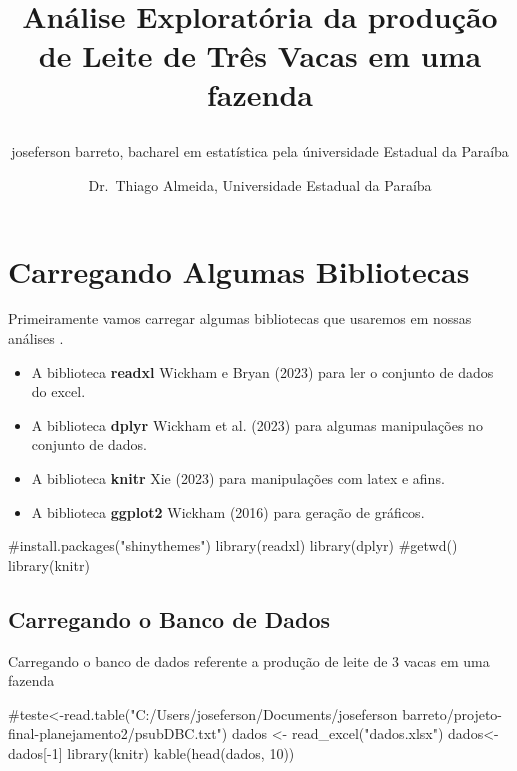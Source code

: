 \documentclass[
  letterpaper,
  DIV=11,
  numbers=noendperiod]{scrartcl}
\title{\\
\strut \\
\strut \\
Análise Exploratória da produção de Leite de Três Vacas em uma fazenda}
\author{joseferson barreto, bacharel em estatística pela úniversidade
Estadual da Paraíba \and Dr.~Thiago Almeida, Universidade Estadual da
Paraíba}
\date{}
\newenvironment{Shaded}{\begin{snugshade}}{\end{snugshade}}
\newcommand{\CommentTok}[1]{\textcolor[rgb]{0.37,0.37,0.37}{#1}}
\newcommand{\DecValTok}[1]{\textcolor[rgb]{0.68,0.00,0.00}{#1}}
\newcommand{\FunctionTok}[1]{\textcolor[rgb]{0.28,0.35,0.67}{#1}}
\newcommand{\NormalTok}[1]{\textcolor[rgb]{0.00,0.23,0.31}{#1}}
\newcommand{\OtherTok}[1]{\textcolor[rgb]{0.00,0.23,0.31}{#1}}
\newcommand{\SpecialCharTok}[1]{\textcolor[rgb]{0.37,0.37,0.37}{#1}}
\newcommand{\StringTok}[1]{\textcolor[rgb]{0.13,0.47,0.30}{#1}}
\renewcommand*\contentsname{Índice}
\newcommand\contentsname{Índice}
\begin{document}
\maketitle

\renewcommand*\contentsname{Sumário}
{
\hypersetup{linkcolor=}
\setcounter{tocdepth}{3}
\tableofcontents
}
\section{Carregando Algumas
Bibliotecas}\label{carregando-algumas-bibliotecas}

Primeiramente vamos carregar algumas bibliotecas que usaremos em nossas
análises .

\begin{itemize}
\item
  A biblioteca \textbf{readxl} Wickham e Bryan (2023) para ler o
  conjunto de dados do excel.
\item
  A biblioteca \textbf{dplyr} Wickham et al. (2023) para algumas
  manipulações no conjunto de dados.
\item
  A biblioteca \textbf{knitr} Xie (2023) para manipulações com latex e
  afins.
\item
  A biblioteca \textbf{ggplot2} Wickham (2016) para geração de gráficos.
\end{itemize}

\begin{Shaded}
\begin{Highlighting}[]
\CommentTok{\#install.packages("shinythemes")}
\FunctionTok{library}\NormalTok{(readxl)}
\FunctionTok{library}\NormalTok{(dplyr)}
\CommentTok{\#getwd()}
\FunctionTok{library}\NormalTok{(knitr)}
\end{Highlighting}
\end{Shaded}

\subsection{Carregando o Banco de
Dados}\label{carregando-o-banco-de-dados}

Carregando o banco de dados referente a produção de leite de 3 vacas em
uma fazenda

\begin{Shaded}
\begin{Highlighting}[]
\CommentTok{\#teste\textless{}{-}read.table("C:/Users/joseferson/Documents/joseferson barreto/projeto{-}final{-}planejamento2/psubDBC.txt")}
\NormalTok{ dados }\OtherTok{\textless{}{-}} \FunctionTok{read\_excel}\NormalTok{(}\StringTok{"dados.xlsx"}\NormalTok{) }
\NormalTok{dados}\OtherTok{\textless{}{-}}\NormalTok{ dados[}\SpecialCharTok{{-}}\DecValTok{1}\NormalTok{]}
 \FunctionTok{library}\NormalTok{(knitr)}
\FunctionTok{kable}\NormalTok{(}\FunctionTok{head}\NormalTok{(dados, }\DecValTok{10}\NormalTok{))}
\end{Highlighting}
\end{Shaded}
\end{document}
